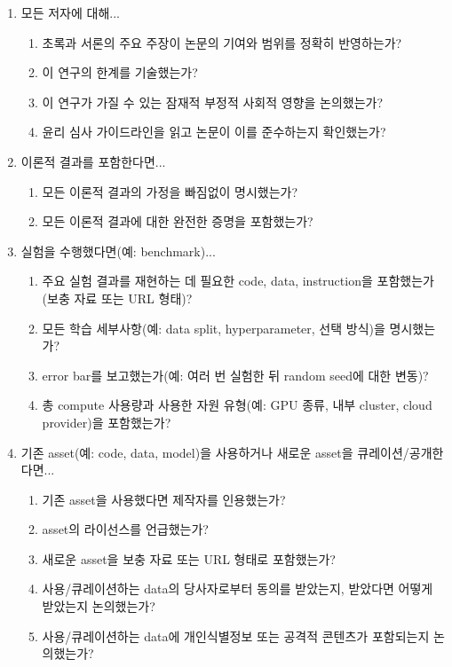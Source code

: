 \documentclass{article}
\begin{document}
\begin{enumerate}

\item 모든 저자에 대해...
\begin{enumerate}
  \item 초록과 서론의 주요 주장이 논문의 기여와 범위를 정확히 반영하는가?
    \answerYes{}
  \item 이 연구의 한계를 기술했는가?
    \answerYes{}
  \item 이 연구가 가질 수 있는 잠재적 부정적 사회적 영향을 논의했는가?
    \answerYes{}
  \item 윤리 심사 가이드라인을 읽고 논문이 이를 준수하는지 확인했는가?
    \answerYes{}
\end{enumerate}

\item 이론적 결과를 포함한다면...
\begin{enumerate}
  \item 모든 이론적 결과의 가정을 빠짐없이 명시했는가?
    \answerNA{}
	\item 모든 이론적 결과에 대한 완전한 증명을 포함했는가?
    \answerNA{}
\end{enumerate}

\item 실험을 수행했다면(예: benchmark)...
\begin{enumerate}
  \item 주요 실험 결과를 재현하는 데 필요한 code, data, instruction을 포함했는가(보충 자료 또는 URL 형태)?
    \answerYes{}
  \item 모든 학습 세부사항(예: data split, hyperparameter, 선택 방식)을 명시했는가?
    \answerYes{}
	\item error bar를 보고했는가(예: 여러 번 실험한 뒤 random seed에 대한 변동)?
    \answerYes{}
	\item 총 compute 사용량과 사용한 자원 유형(예: GPU 종류, 내부 cluster, cloud provider)을 포함했는가?
    \answerYes{}
\end{enumerate}

\item 기존 asset(예: code, data, model)을 사용하거나 새로운 asset을 큐레이션/공개한다면...
\begin{enumerate}
  \item 기존 asset을 사용했다면 제작자를 인용했는가?
    \answerYes{}
  \item asset의 라이선스를 언급했는가?
    \answerYes{}
  \item 새로운 asset을 보충 자료 또는 URL 형태로 포함했는가?
    \answerYes{}
  \item 사용/큐레이션하는 data의 당사자로부터 동의를 받았는지, 받았다면 어떻게 받았는지 논의했는가?
    \answerNA{}
  \item 사용/큐레이션하는 data에 개인식별정보 또는 공격적 콘텐츠가 포함되는지 논의했는가?
    \answerNA{}
\end{enumerate}


\end{enumerate}
\end{document}
